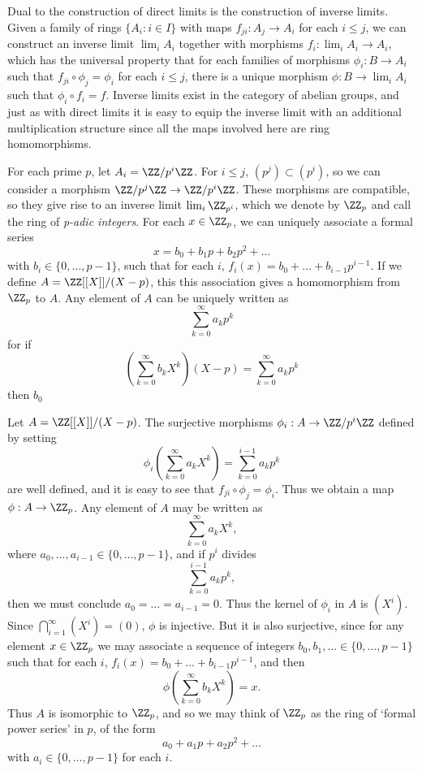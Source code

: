 Dual to the construction of direct limits is the construction of inverse limits. Given a family of rings $\{ A_i : i \in I \}$ with maps $f_{ji}: A_j \to A_i$ for each $i \leq j$, we can construct an inverse limit $\lim_i A_i$ together with morphisms $f_i: \lim_i A_i \to A_i$, which has the universal property that for each families of morphisms $\phi_i: B \to A_i$ such that $f_{ji} \circ \phi_j = \phi_i$ for each $i \leq j$, there is a unique morphism $\phi: B \to \lim_i A_i$ such that $\phi_i \circ f_i = f$. Inverse limits exist in the category of abelian groups, and just as with direct limits it is easy to equip the inverse limit with an additional multiplication structure since all the maps involved here are ring homomorphisms.

\begin{example}
    For each prime $p$, let $A_i = \ZZ/p^i \ZZ$. For $i \leq j$, $(p^j) \subset (p^i)$, so we can consider a morphism $\ZZ/p^j\ZZ \to \ZZ/p^i\ZZ$. These morphisms are compatible, so they give rise to an inverse limit $\lim_i \ZZ_{p^i}$, which we denote by $\ZZ_p$ and call the ring of \emph{p-adic integers}. For each $x \in \ZZ_p$, we can uniquely associate a formal series
    \[ x = b_0 + b_1p + b_2p^2 + \dots \]
    with $b_i \in \{ 0, \dots, p-1 \}$, such that for each $i$, $f_i(x) = b_0 + \dots + b_{i-1}p^{i-1}$. If we define $A = \ZZ[[X]] / (X - p)$, this this association gives a homomorphism from $\ZZ_p$ to $A$. Any element of $A$ can be uniquely written as
    \[ \sum_{k = 0}^\infty a_k p^k \]
    for if
    \[ \left( \sum_{k = 0}^\infty b_k X^k \right) (X - p) = \sum_{k = 0}^\infty a_k p^k \]
    then $b_0$

    Let $A = \ZZ[[X]] / (X - p)$. The surjective morphisms $\phi_i: A \to \ZZ/p^i \ZZ$ defined by setting
    \[ \phi_i \left( \sum_{k = 0}^\infty a_k X^k \right) = \sum_{k = 0}^{i-1} a_k p^k \]
    are well defined, and it is easy to see that $f_{ji} \circ \phi_j = \phi_i$. Thus we obtain a map $\phi: A \to \ZZ_p$. Any element of $A$ may be written as
    \[ \sum_{k = 0}^\infty a_k X^k, \]
    where $a_0, \dots, a_{i-1} \in \{ 0, \dots, p-1 \}$, and if $p^i$ divides
    \[ \sum_{k = 0}^{i-1} a_k p^k, \]
    then we must conclude $a_0 = \dots = a_{i-1} = 0$. Thus the kernel of $\phi_i$ in $A$ is $(X^i)$. Since $\bigcap_{i = 1}^\infty (X^i) = (0)$, $\phi$ is injective. But it is also surjective, since for any element $x \in \ZZ_p$ we may associate a sequence of integers $b_0, b_1, \dots \in \{ 0, \dots, p - 1 \}$ such that for each $i$, $f_i(x) = b_0 + \dots + b_{i-1} p^{i-1}$, and then
    \[ \phi \left( \sum_{k = 0}^\infty b_k X^k \right) = x. \]
    Thus $A$ is isomorphic to $\ZZ_p$, and so we may think of $\ZZ_p$ as the ring of `formal power series' in $p$, of the form
    \[ a_0 + a_1p + a_2p^2 + \dots \]
    with $a_i \in \{ 0, \dots, p-1 \}$ for each $i$.


\end{example}
